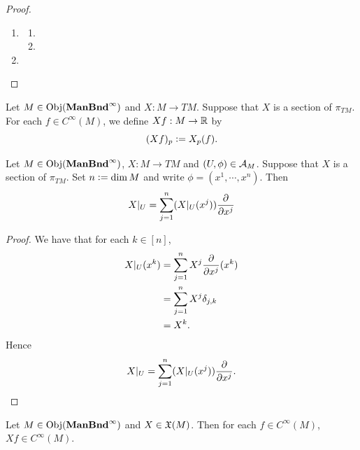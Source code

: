 \documentclass{book}
\begin{document}
\begin{proof}\
	\begin{enumerate}
		\item 
		\begin{enumerate}
			\item 
			\item 
		\end{enumerate}
		\item 
	\end{enumerate}
\end{proof}

\begin{defn}
	Let $M \in \operatorname{Obj}(\operatorname*{\text{\textbf{ManBnd}}^{\infty}})$ and $X: M \rightarrow TM$. Suppose that $X$ is a section of $\pi_{TM}$. For each $f \in C^{\infty}(M)$, we define $Xf: M \rightarrow \mathbb{R}$ by 
	$$(Xf)_p \vcentcolon= X_p(f).$$
\end{defn}

\begin{ex}
	Let $M \in \operatorname{Obj}(\operatorname*{\text{\textbf{ManBnd}}^{\infty}})$, $X: M \rightarrow TM$ and $(U, \phi) \in \mathcal{A}_M$. Suppose that $X$ is a section of $\pi_{TM}$. Set $n \vcentcolon= \dim M$ and write $\phi = (x^1, \cdots, x^n)$. Then 
	$$X|_U = \sum_{j=1}^n (X|_U(x^j))\frac{\partial}{\partial x^j}$$ 
\end{ex}

\begin{proof}
	We have that for each $k \in [n]$, 
	\begin{align*}
		X|_U(x^k) 
		& = \sum_{j=1}^n X^j\frac{\partial}{\partial x^j} (x^k) \\
		& = \sum_{j=1}^n X^j \delta_{j,k} \\
		& = X^k.
	\end{align*}
	Hence 
	$$X|_U = \sum_{j=1}^n (X|_U(x^j))\frac{\partial}{\partial x^j}.$$
\end{proof}

\begin{ex}
	Let $M \in \operatorname{Obj}(\operatorname*{\text{\textbf{ManBnd}}^{\infty}})$ and $X \in \mathfrak{X}(M)$. Then for each $f \in C^{\infty}(M)$, $Xf \in C^{\infty}(M)$.
\end{ex}
\end{document}

